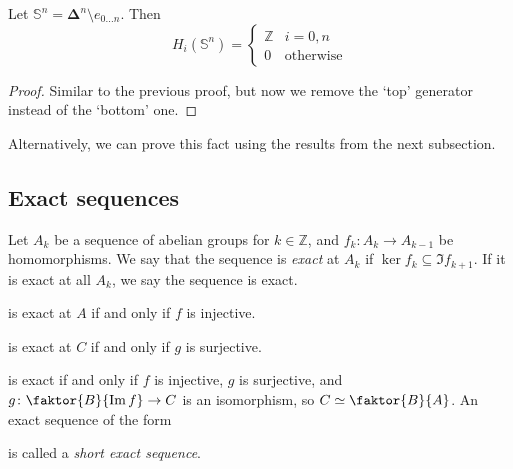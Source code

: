 \begin{definition}
	Let \( \mathbb S^n = \bm\Delta^n \setminus e_{0\dots n} \).
	Then
	\[ H_i(\mathbb S^n) = \begin{cases}
		\mathbb Z & i = 0, n \\
		0 & \text{otherwise}
	\end{cases} \]
\end{definition}
\begin{proof}
	Similar to the previous proof, but now we remove the `top' generator instead of the `bottom' one.
\end{proof}
Alternatively, we can prove this fact using the results from the next subsection.

\subsection{Exact sequences}
\begin{definition}
	Let \( A_k \) be a sequence of abelian groups for \( k \in \mathbb Z \), and \( f_k \colon A_k \to A_{k-1} \) be homomorphisms.
	We say that the sequence is \emph{exact} at \( A_k \) if \( \ker f_k \subseteq \Im f_{k+1} \).
	If it is exact at all \( A_k \), we say the sequence is exact.
	\begin{center}
	\end{center}
\end{definition}
\begin{example}
	is exact at \( A \) if and only if \( f \) is injective.
	is exact at \( C \) if and only if \( g \) is surjective.
	is exact if and only if \( f \) is injective, \( g \) is surjective, and \( g \colon \faktor{B}{\Im f} \to C \) is an isomorphism, so \( C \simeq \faktor{B}{A} \).
	An exact sequence of the form
	is called a \emph{short exact sequence}.
\end{example}
